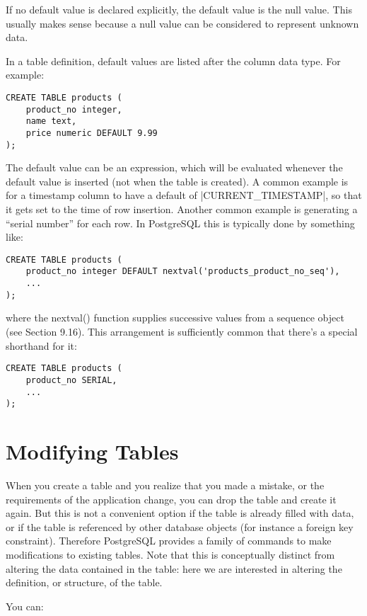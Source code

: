 If no default value is declared explicitly, the default value is the null value. This usually makes sense because a null value can be considered to represent unknown data.

In a table definition, default values are listed after the column data type. For example:

\begin{verbatim}
CREATE TABLE products (
    product_no integer,
    name text,
    price numeric DEFAULT 9.99
);
\end{verbatim}

The default value can be an expression, which will be evaluated whenever the default value is inserted (not when the table is created). A common example is for a timestamp column to have a default of |CURRENT_TIMESTAMP|, so that it gets set to the time of row insertion. Another common example is generating a “serial number” for each row. In PostgreSQL this is typically done by something like:

\begin{verbatim}
CREATE TABLE products (
    product_no integer DEFAULT nextval('products_product_no_seq'),
    ...
);
\end{verbatim}

where the nextval() function supplies successive values from a sequence object (see Section 9.16). This arrangement is sufficiently common that there's a special shorthand for it:

\begin{verbatim}
CREATE TABLE products (
    product_no SERIAL,
    ...
);
\end{verbatim}

\section{Modifying Tables}


When you create a table and you realize that you made a mistake, or the requirements of the application change, you can drop the table and create it again. But this is not a convenient option if the table is already filled with data, or if the table is referenced by other database objects (for instance a foreign key constraint). Therefore PostgreSQL provides a family of commands to make modifications to existing tables. Note that this is conceptually distinct from altering the data contained in the table: here we are interested in altering the definition, or structure, of the table.

You can:

